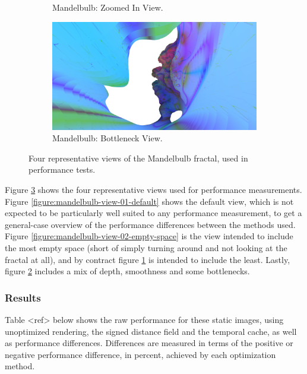 \begin{figure}[ht]
\begin{subfigure}[c]{0.45\linewidth}
		\caption{Mandelbulb: Zoomed In View.}
		\label{figure:mandelbulb-view-03-no-space}
	\end{subfigure}
	\hfill
	\begin{subfigure}[c]{0.45\linewidth}
		\includegraphics[width=\linewidth, frame]{Images/Results/Mandelbulb-View-04-Bottleneck}
		\caption{Mandelbulb: Bottleneck View.}
		\label{figure:mandelbulb-view-04-bottleneck}
	\end{subfigure}

	\caption{Four representative views of the Mandelbulb fractal, used in performance tests.}
	\label{figure:mandelbulb-views}
\end{figure}

Figure \ref{figure:mandelbulb-views} shows the four representative views used for performance measurements. Figure \ref{figure:mandelbulb-view-01-default} shows the default view, which is not expected to be particularly well suited to any performance measurement, to get a general-case overview of the performance differences between the methods used. Figure \ref{figure:mandelbulb-view-02-empty-space} is the view intended to include the most empty space (short of simply turning around and not looking at the fractal at all), and by contract figure \ref{figure:mandelbulb-view-03-no-space} is intended to include the least. Lastly, figure \ref{figure:mandelbulb-view-04-bottleneck} includes a mix of depth, smoothness and some bottlenecks.

\subsubsection{Results}

Table <ref> below shows the raw performance for these static images, using unoptimized rendering, the signed distance field and the temporal cache, as well as performance differences. Differences are measured in terms of the positive or negative performance difference, in percent, achieved by each optimization method.


